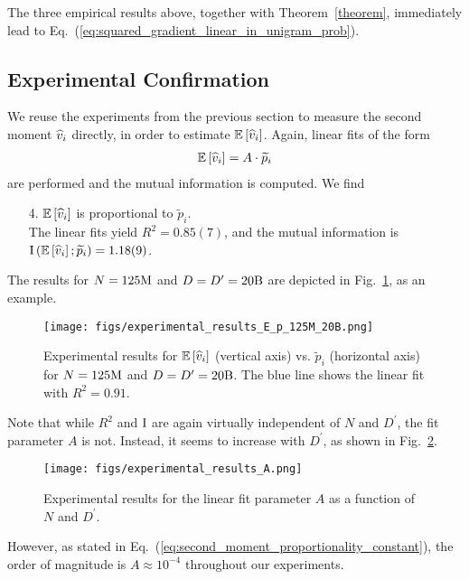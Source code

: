 The three empirical results above, together with Theorem~\ref{theorem}, immediately lead to Eq.~(\ref{eq:squared_gradient_linear_in_unigram_prob}).

\subsection{Experimental Confirmation}
\label{app:second_moment_empirical}

We reuse the experiments from the previous section to measure the second moment $\widehat{v}_i$ directly, in order to estimate $\mathbb{E} \left[ \widehat{v}_i \right]$. Again, linear fits of the form
\begin{align}
    \mathbb{E} \left[ \widehat{v}_i \right] = A \cdot \widetilde p_i
\end{align}
are performed and the mutual information is computed. 
We find
\begin{enumerate}
\item[4.] $\mathbb{E} \left[ \widehat{v}_i \right]$ is proportional to $\widetilde p_i$. \\
The linear fits yield $R^2 = 0.85(7)$, and the mutual information is ${\rm I} \left( \mathbb{E} \left[ \widehat{v}_i \right]; \widetilde p_i \right) = 1.18(9)$.
\end{enumerate}
The results for $N=125\rm M$ and $D=D^\prime=20\rm B$ are depicted in Fig.~\ref{fig:experimental_results_E_p}, as an example.
\begin{figure}[h!]
    \centering
    \texttt{[image: figs/experimental\_results\_E\_p\_125M\_20B.png]}
    \caption{Experimental results for $\mathbb{E} \left[ \widehat{v}_i \right]$ (vertical axis) vs. $\widetilde p_i$ (horizontal axis) for $N=125\rm M$ and $D=D^\prime=20\rm B$. The blue line shows the linear fit with $R^2 = 0.91$.}
    \label{fig:experimental_results_E_p}
\end{figure}

Note that while $R^2$ and ${\rm I}$ are again virtually independent of $N$ and $D^\prime$, the fit parameter $A$ is not. Instead, it seems to increase with $D^\prime$, as shown in Fig.~\ref{fig:experimental_results_A}.
\begin{figure}[h!]
    \centering
    \texttt{[image: figs/experimental\_results\_A.png]}
    \caption{Experimental results for the linear fit parameter $A$ as a function of $N$ and $D^\prime$.}
    \label{fig:experimental_results_A}
\end{figure}
However, as stated in Eq.~(\ref{eq:second_moment_proportionality_constant}), the order of magnitude is $A \approx 10^{-4}$ throughout our experiments.
